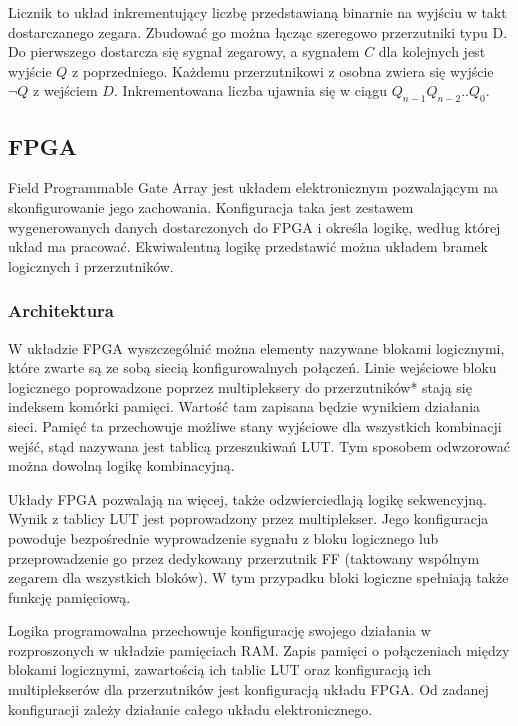 \documentclass[a4paper,12pt]{article}
\begin{document}
Licznik to układ inkrementujący liczbę przedstawianą binarnie na wyjściu w takt dostarczanego zegara. Zbudować go można łącząc szeregowo przerzutniki typu D. Do pierwszego dostarcza się sygnał zegarowy, a sygnałem $C$ dla kolejnych jest wyjście $Q$ z poprzedniego. Każdemu przerzutnikowi z osobna zwiera się wyjście $\lnot Q$ z wejściem $D$. Inkrementowana liczba ujawnia się w ciągu $Q_{n-1} Q_{n-2} .. Q_{0}$.

\subsection{FPGA}

Field Programmable Gate Array jest układem elektronicznym pozwalającym na skonfigurowanie jego zachowania. Konfiguracja taka jest zestawem wygenerowanych danych dostarczonych do FPGA i określa logikę, według której układ ma pracować. Ekwiwalentną logikę przedstawić można układem bramek logicznych i przerzutników.

\subsubsection{Architektura}

W układzie FPGA wyszczególnić można elementy nazywane blokami logicznymi, które zwarte są ze sobą siecią konfigurowalnych połączeń. Linie wejściowe bloku logicznego poprowadzone poprzez multipleksery do przerzutników* stają się indeksem komórki pamięci. Wartość tam zapisana będzie wynikiem działania sieci. Pamięć ta przechowuje możliwe stany wyjściowe dla wszystkich kombinacji wejść, stąd nazywana jest tablicą przeszukiwań LUT. Tym sposobem odwzorować można dowolną logikę kombinacyjną.

Układy FPGA pozwalają na więcej, także odzwierciedlają logikę sekwencyjną. Wynik z tablicy LUT jest poprowadzony przez multiplekser. Jego konfiguracja powoduje bezpośrednie wyprowadzenie sygnału z bloku logicznego lub przeprowadzenie go przez dedykowany przerzutnik FF (taktowany wspólnym zegarem dla wszystkich bloków). W tym przypadku bloki logiczne spełniają także funkcję pamięciową.

Logika programowalna przechowuje konfigurację swojego działania w rozproszonych w układzie pamięciach RAM. Zapis pamięci o połączeniach między blokami logicznymi, zawartością ich tablic LUT oraz konfiguracją ich multiplekserów dla przerzutników jest konfiguracją układu FPGA. Od zadanej konfiguracji zależy działanie całego układu elektronicznego.
\end{document}
